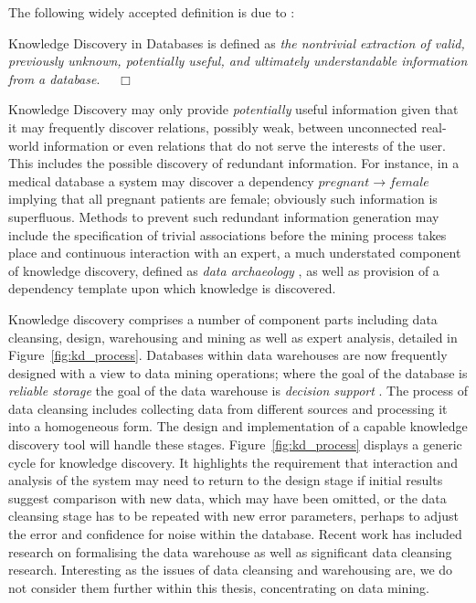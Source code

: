 The following widely accepted definition is due to \cite{kdd96}:

\begin{definition}
\begin{rm} Knowledge Discovery in Databases is defined as {\em the
nontrivial extraction of valid, previously unknown, potentially
useful, and ultimately understandable information from a
database}. $\quad\Box$ 
\end{rm}
\end{definition}

Knowledge Discovery may only provide {\em potentially} useful
information given that it may frequently discover relations, possibly
weak, between unconnected real-world information or even relations
that do not serve the interests of the user.  This includes the
possible discovery of redundant information. For instance, in a
medical database a system may discover a dependency $pregnant
\rightarrow female$ implying that all pregnant patients are female;
obviously such information is superfluous. Methods 
to prevent such redundant information generation may include the
specification of trivial associations before the mining process takes
place and continuous interaction with an expert, a much understated
component of knowledge discovery, defined as {\em data
archaeology} \cite{ba96}, as well as provision of a dependency
template upon which knowledge is discovered.   

\medskip
Knowledge discovery comprises a number of component parts including
data cleansing, design, warehousing and mining as well as expert
analysis, detailed in Figure~\ref{fig:kd_process}. Databases within
data warehouses are now frequently designed with a view to data mining
operations; where the goal of the database is {\em reliable storage}
the goal of the data warehouse is {\em decision support}
\cite{fay98b}. The process of data cleansing includes collecting data 
from different sources and processing it into a homogeneous form. The
design and implementation of a capable knowledge discovery tool will handle
these stages. Figure~\ref{fig:kd_process} displays a generic cycle
for knowledge discovery. It highlights the requirement that
interaction and analysis of the system may need to return to the
design stage if initial results suggest comparison with new data, which
may have been omitted, or the data cleansing stage has to be repeated
with new error parameters, perhaps to adjust the error and confidence
for noise within the database.  
Recent work has included
research on formalising the data warehouse \cite{hgmw95,inm96a} as
well as significant
data cleansing research.  Interesting as the issues of data
cleansing and warehousing are, we do not consider them further within
this thesis, concentrating on data mining.


